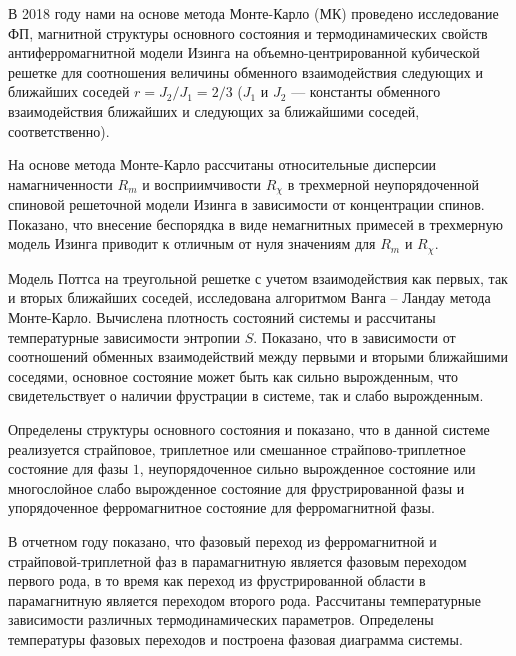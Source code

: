 В 2018 году нами на основе метода Монте-Карло (МК) проведено исследование ФП, магнитной структуры основного состояния и термодинамических свойств антиферромагнитной модели Изинга на объемно-центрированной кубической решетке для соотношения величины обменного взаимодействия следующих и ближайших соседей $r=J_2/J_1=2/3$ ($J_1$ и $J_2$ --- константы обменного взаимодействия ближайших и следующих за ближайшими соседей, соответственно).

На основе метода Монте-Карло рассчитаны относительные дисперсии намагниченности  $R_m$ и восприимчивости $R_\chi$  в трехмерной неупорядоченной спиновой решеточной модели Изинга в зависимости от концентрации спинов. Показано, что внесение беспорядка в виде немагнитных примесей в трехмерную модель Изинга приводит к отличным от нуля значениям для $R_m$ и $R_\chi$.


Модель Поттса на треугольной решетке с учетом взаимодействия как первых, так и вторых ближайших соседей, исследована алгоритмом Ванга -- Ландау метода Монте-Карло. Вычислена плотность состояний системы и рассчитаны температурные зависимости энтропии $S$. Показано, что в зависимости от соотношений обменных взаимодействий между первыми и вторыми ближайшими соседями, основное состояние может быть как сильно вырожденным, что свидетельствует о наличии фрустрации в системе, так и слабо вырожденным.

Определены структуры основного состояния и показано, что в данной системе реализуется страйповое, триплетное или смешанное страйпово-триплетное состояние для фазы $1$, неупорядоченное сильно вырожденное состояние или многослойное слабо вырожденное состояние для фрустрированной фазы и упорядоченное ферромагнитное состояние для ферромагнитной фазы.

В отчетном году показано, что фазовый переход из ферромагнитной и страйповой-триплетной фаз в парамагнитную является фазовым переходом первого рода, в то время как переход из фрустрированной области в парамагнитную является переходом второго рода. Рассчитаны температурные зависимости различных термодинамических параметров. Определены температуры фазовых переходов и построена фазовая диаграмма системы.































